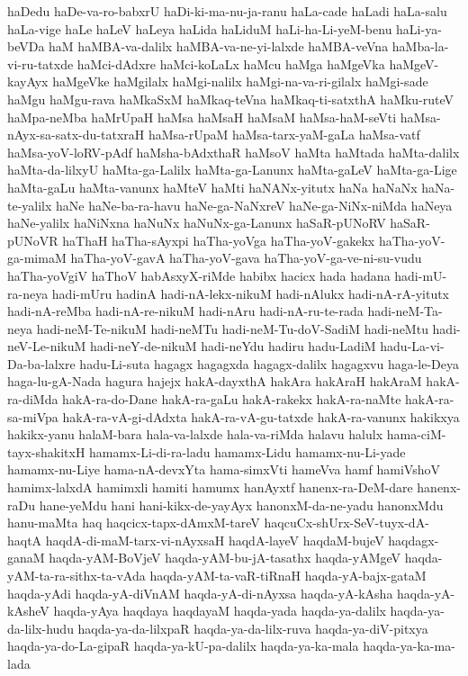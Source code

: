 {haDedu
haDe-va-ro-babxrU
haDi-ki-ma-nu-ja-ranu
haLa-cade
haLadi
haLa-salu
haLa-vige
haLe
haLeV
haLeya
haLida
haLiduM
haLi-ha-Li-yeM-benu
haLi-ya-beVDa
haM
haMBA-va-dalilx
haMBA-va-ne-yi-lalxde
haMBA-veVna
haMba-la-vi-ru-tatxde
haMci-dAdxre
haMci-koLaLx
haMcu
haMga
haMgeVka
haMgeV-kayAyx
haMgeVke
haMgilalx
haMgi-nalilx
haMgi-na-va-ri-gilalx
haMgi-sade
haMgu
haMgu-rava
haMkaSxM
haMkaq-teVna
haMkaq-ti-satxthA
haMku-ruteV
haMpa-neMba
haMrUpaH
haMsa
haMsaH
haMsaM
haMsa-haM-seVti
haMsa-nAyx-sa-satx-du-tatxraH
haMsa-rUpaM
haMsa-tarx-yaM-gaLa
haMsa-vatf
haMsa-yoV-loRV-pAdf
haMsha-bAdxthaR
haMsoV
haMta
haMtada
haMta-dalilx
haMta-da-lilxyU
haMta-ga-Lalilx
haMta-ga-Lanunx
haMta-gaLeV
haMta-ga-Lige
haMta-gaLu
haMta-vanunx
haMteV
haMti
haNANx-yitutx
haNa
haNaNx
haNa-te-yalilx
haNe
haNe-ba-ra-havu
haNe-ga-NaNxreV
haNe-ga-NiNx-niMda
haNeya
haNe-yalilx
haNiNxna
haNuNx
haNuNx-ga-Lanunx
haSaR-pUNoRV
haSaR-pUNoVR
haThaH
haTha-sAyxpi
haTha-yoVga
haTha-yoV-gakekx
haTha-yoV-ga-mimaM
haTha-yoV-gavA
haTha-yoV-gava
haTha-yoV-ga-ve-ni-su-vudu
haTha-yoVgiV
haThoV
habAsxyX-riMde
habibx
hacicx
hada
hadana
hadi-mU-ra-neya
hadi-mUru
hadinA
hadi-nA-lekx-nikuM
hadi-nAlukx
hadi-nA-rA-yitutx
hadi-nA-reMba
hadi-nA-re-nikuM
hadi-nAru
hadi-nA-ru-te-rada
hadi-neM-Ta-neya
hadi-neM-Te-nikuM
hadi-neMTu
hadi-neM-Tu-doV-SadiM
hadi-neMtu
hadi-neV-Le-nikuM
hadi-neY-de-nikuM
hadi-neYdu
hadiru
hadu-LadiM
hadu-La-vi-Da-ba-lalxre
hadu-Li-suta
hagagx
hagagxda
hagagx-dalilx
hagagxvu
haga-le-Deya
haga-lu-gA-Nada
hagura
hajejx
hakA-dayxthA
hakAra
hakAraH
hakAraM
hakA-ra-diMda
hakA-ra-do-Dane
hakA-ra-gaLu
hakA-rakekx
hakA-ra-naMte
hakA-ra-sa-miVpa
hakA-ra-vA-gi-dAdxta
hakA-ra-vA-gu-tatxde
hakA-ra-vanunx
hakikxya
hakikx-yanu
halaM-bara
hala-va-lalxde
hala-va-riMda
halavu
halulx
hama-ciM-tayx-shakitxH
hamamx-Li-di-ra-ladu
hamamx-Lidu
hamamx-nu-Li-yade
hamamx-nu-Liye
hama-nA-devxYta
hama-simxVti
hameVva
hamf
hamiVshoV
hamimx-lalxdA
hamimxli
hamiti
hamumx
hanAyxtf
hanenx-ra-DeM-dare
hanenx-raDu
hane-yeMdu
hani
hani-kikx-de-yayAyx
hanonxM-da-ne-yadu
hanonxMdu
hanu-maMta
haq
haqcicx-tapx-dAmxM-tareV
haqcuCx-shUrx-SeV-tuyx-dA-haqtA
haqdA-di-maM-tarx-vi-nAyxsaH
haqdA-layeV
haqdaM-bujeV
haqdagx-ganaM
haqda-yAM-BoVjeV
haqda-yAM-bu-jA-tasathx
haqda-yAMgeV
haqda-yAM-ta-ra-sithx-ta-vAda
haqda-yAM-ta-vaR-tiRnaH
haqda-yA-bajx-gataM
haqda-yAdi
haqda-yA-diVnAM
haqda-yA-di-nAyxsa
haqda-yA-kAsha
haqda-yA-kAsheV
haqda-yAya
haqdaya
haqdayaM
haqda-yada
haqda-ya-dalilx
haqda-ya-da-lilx-hudu
haqda-ya-da-lilxpaR
haqda-ya-da-lilx-ruva
haqda-ya-diV-pitxya
haqda-ya-do-La-gipaR
haqda-ya-kU-pa-dalilx
haqda-ya-ka-mala
haqda-ya-ka-ma-lada
}
